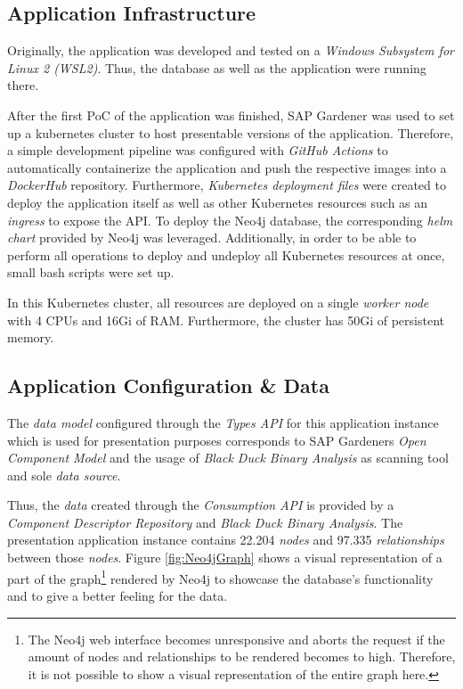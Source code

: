 \subsection{Application Infrastructure}
Originally, the application was developed and tested on a \emph{Windows Subsystem for Linux 2 (WSL2)}. Thus, the database as well as the application were running there.\par
After the first PoC of the application was finished, SAP Gardener was used to set up a kubernetes cluster to host presentable versions of the application. Therefore, a simple development pipeline was configured with \emph{GitHub Actions} %
to automatically containerize the application and push the respective images into a \emph{DockerHub} repository. Furthermore, \emph{Kubernetes deployment files} were created to deploy the application itself as well as other Kubernetes resources such as an \emph{ingress} to expose the API. To deploy the Neo4j database, the corresponding \emph{helm chart} provided by Neo4j was leveraged. Additionally, in order to be %
able to perform all operations to deploy and undeploy all Kubernetes resources at once, small bash scripts were set up.\par
In this Kubernetes cluster, all resources are deployed on a single \emph{worker node} with 4 CPUs and 16Gi of RAM. %
Furthermore, the cluster has 50Gi of persistent memory.

\subsection{Application Configuration \& Data}
The \emph{data model} configured through the \emph{Types API} for this application instance which is used for presentation purposes corresponds to SAP Gardeners \emph{Open Component Model} and the usage of \emph{Black Duck Binary Analysis} as scanning tool and sole \emph{data source}.\par
Thus, the \emph{data} created through the \emph{Consumption API} is provided by a \emph{Component Descriptor Repository} and \emph{Black Duck Binary Analysis}. The presentation application instance contains 22.204 \emph{nodes} and 97.335 \emph{relationships} between those \emph{nodes}. Figure \ref{fig:Neo4jGraph} shows a visual representation of a part of the graph\footnote{The Neo4j web interface becomes unresponsive and aborts the request if the amount of nodes and relationships to be rendered becomes to high. Therefore, it is not possible to show a visual representation of the entire graph here.} rendered by Neo4j to showcase the database's functionality and to give a better feeling for the data.\par

